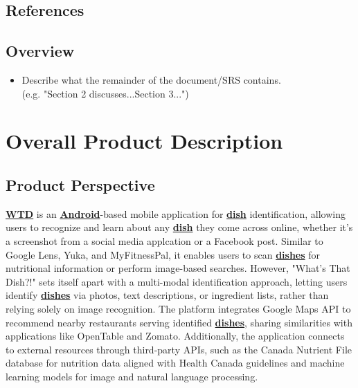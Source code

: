 \documentclass[]{article}
\begin{document}

\subsection{References}
\label{sub:references}

\renewcommand{\refname}{}  %
\vspace{-7mm}  %


\subsection{Overview}
\label{sub:overview}
\begin{itemize}
	\item Describe what the remainder of the document/SRS contains.\\
	(e.g. "Section 2 discusses...Section 3...")
\end{itemize}


\section{Overall Product Description}
\label{sec:overall_description}

\subsection{Product Perspective}
\label{sub:product_perspective}

\hyperref[WTD]{\textbf{WTD}} is an \hyperref[Android]{\textbf{Android}}-based mobile application for \hyperref[Dish]{\textbf{dish}} identification, allowing users to recognize and learn about any \hyperref[Dish]{\textbf{dish}} they come across online, whether it's a screenshot from a social media applcation or a Facebook post. Similar to Google Lens, Yuka, and MyFitnessPal, it enables users to scan \hyperref[Dish]{\textbf{dishes}} for nutritional information or perform image-based searches. However, "What’s That Dish?!" sets itself apart with a multi-modal identification approach, letting users identify \hyperref[Dish]{\textbf{dishes}} via photos, text descriptions, or ingredient lists, rather than relying solely on image recognition. The platform integrates Google Maps API to recommend nearby restaurants serving identified \hyperref[Dish]{\textbf{dishes}}, sharing similarities with applications like OpenTable and Zomato. Additionally, the application connects to external resources through third-party APIs, such as the Canada Nutrient File database for nutrition data aligned with Health Canada guidelines and machine learning models for image and natural language processing.
\end{document}
